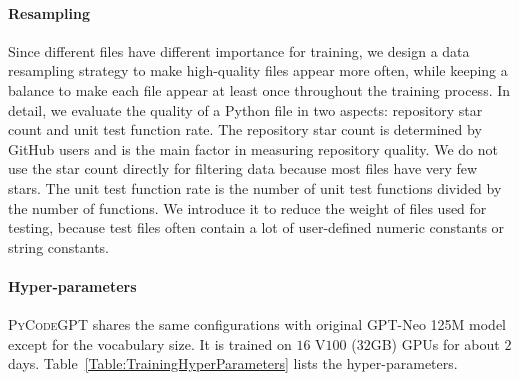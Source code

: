 \documentclass{article}
\newcommand{\codepy}{\textsc{PyCodeGPT}\xspace}
\begin{document}
\paragraph{Resampling}
Since different files have different importance for training, 
we design a data resampling strategy to make high-quality files appear more often, while keeping a balance to make each file appear at least once throughout the training process. 
In detail, we evaluate the quality of a Python file in two aspects: repository star count and unit test function rate. The repository star count is determined by GitHub users and is the main factor in measuring repository quality. We do not use the star count directly for filtering data because most files have very few stars.
The unit test function rate is the number of unit test functions divided by the number of functions. We introduce it to reduce the weight of files used for testing, because test files often contain a lot of user-defined numeric constants or string constants.

\paragraph{Hyper-parameters}
\codepy shares the same configurations with original GPT-Neo 125M model except for the vocabulary size. It is trained on $16$ V$100$ ($32$GB) GPUs for about $2$ days. Table~\ref{Table:TrainingHyperParameters} lists the hyper-parameters.
\end{document}
